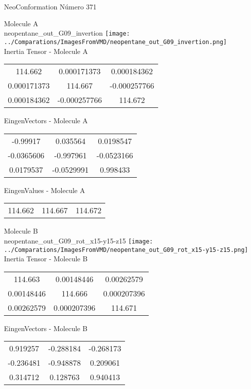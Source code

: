 \vtab[-2cm]
\begin{center}
{\large NeoConformation \tab Número 371}
\end{center}
\begin{multicols}{2}
\begin{center}

Molecule A \\ 
neopentane\_out\_G09\_invertion
\texttt{[image: ../Comparations/ImagesFromVMD/neopentane\_out\_G09\_invertion.png]}
\\
Inertia Tensor - Molecule A \\
\vtab

\begin{tabular}{|c c c|}
114.662	 & 	0.000171373	 & 	0.000184362	 \\
0.000171373	 & 	114.667	 & 	-0.000257766	 \\
0.000184362	 & 	-0.000257766	 & 	114.672
\end{tabular}

\vtab
 EingenVectors - Molecule A     \\
\vtab
\begin{tabular}{|c c c|}
-0.99917	 & 	0.035564	 & 	0.0198547	 \\
-0.0365606	 & 	-0.997961	 & 	-0.0523166	 \\
0.0179537	 & 	-0.0529991	 & 	0.998433
\end{tabular}

\vtab
 EingenValues - Molecule A     \\
\vtab
\begin{tabular}{|c c c|}
114.662	 & 	114.667	 & 	114.672	 \\
\end{tabular}
\columnbreak

Molecule B \\ 
neopentane\_out\_G09\_rot\_x15-y15-z15
\texttt{[image: ../Comparations/ImagesFromVMD/neopentane\_out\_G09\_rot\_x15-y15-z15.png]}
\\
Inertia Tensor - Molecule B \\
\vtab

\begin{tabular}{|c c c|}
114.663	 & 	0.00148446	 & 	0.00262579	 \\
0.00148446	 & 	114.666	 & 	0.000207396	 \\
0.00262579	 & 	0.000207396	 & 	114.671
\end{tabular}

\vtab
 EingenVectors - Molecule B     \\
\vtab
\begin{tabular}{|c c c|}
0.919257	 & 	-0.288184	 & 	-0.268173	 \\
-0.236481	 & 	-0.948878	 & 	0.209061	 \\
0.314712	 & 	0.128763	 & 	0.940413
\end{tabular}


\end{center}
\end{multicols}
